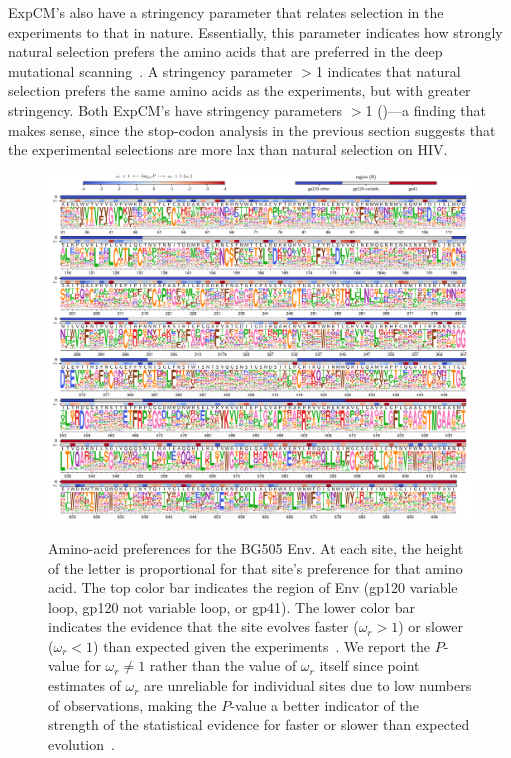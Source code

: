 \documentclass[9pt]{elife}
\begin{document}
ExpCM's also have a stringency parameter that relates selection in the experiments to that in nature.
Essentially, this parameter indicates how strongly natural selection prefers the amino acids that are preferred in the deep mutational scanning~\citep{hilton2017phydms}.
A stringency parameter $>$1 indicates that natural selection prefers the same amino acids as the experiments, but with greater stringency.
Both ExpCM's have stringency parameters $>$1 ()---a finding that makes sense, since the stop-codon analysis in the previous section suggests that the experimental selections are more lax than natural selection on HIV.

\begin{figure}
\begin{fullwidth}
{\includegraphics[width=1.3\textwidth]{figures/BG505_prefs.pdf}}
\caption{\label{fig:BG505prefs}
Amino-acid preferences for the BG505 Env.
At each site, the height of the letter is proportional for that site's preference for that amino acid.
The top color bar indicates the region of Env (gp120 variable loop, gp120 not variable loop, or gp41).
The lower color bar indicates the evidence that the site evolves faster ($\omega_r > 1$) or slower ($\omega_r < 1$) than expected given the experiments~\citep[see the last section of the Results and][]{bloom2017identification}.
We report the $P$-value for $\omega_r \ne 1$ rather than the value of $\omega_r$ itself since point estimates of $\omega_r$ are unreliable for individual sites due to low numbers of observations, making the $P$-value a better indicator of the strength of the statistical evidence for faster or slower than expected evolution~\citep{kosakovsky2005not,murrell2012detecting}.
}
\end{fullwidth}
\end{figure}
\end{document}
